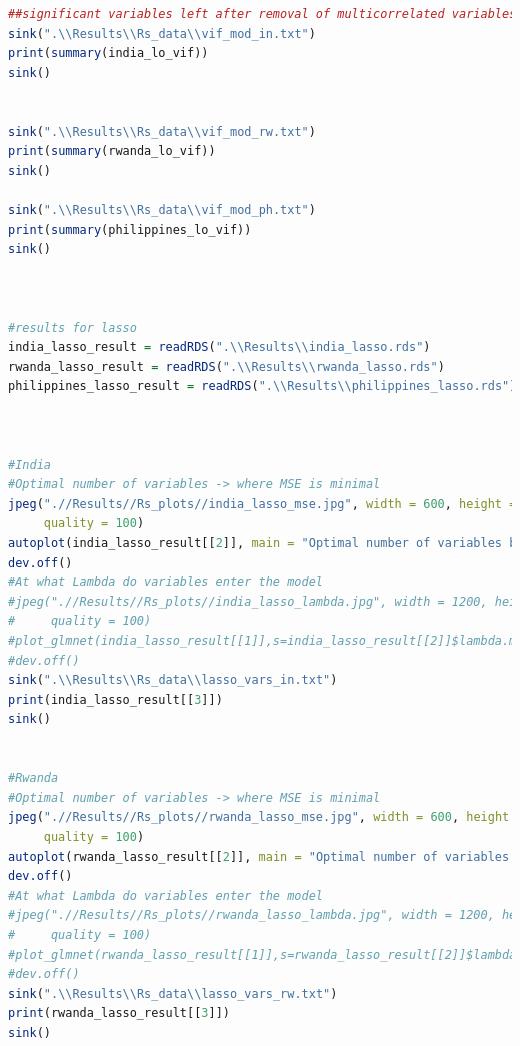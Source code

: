 \documentclass[11pt]{article}
\begin{document}
\begin{lstlisting}[language= R]
##significant variables left after removal of multicorrelated variables by removeVif()
sink(".\\Results\\Rs_data\\vif_mod_in.txt")
print(summary(india_lo_vif))
sink() 


sink(".\\Results\\Rs_data\\vif_mod_rw.txt")
print(summary(rwanda_lo_vif))
sink() 

sink(".\\Results\\Rs_data\\vif_mod_ph.txt")
print(summary(philippines_lo_vif))
sink() 



#results for lasso
india_lasso_result = readRDS(".\\Results\\india_lasso.rds")
rwanda_lasso_result = readRDS(".\\Results\\rwanda_lasso.rds")
philippines_lasso_result = readRDS(".\\Results\\philippines_lasso.rds")



#India
#Optimal number of variables -> where MSE is minimal
jpeg(".//Results//Rs_plots//india_lasso_mse.jpg", width = 600, height = 600, units = "px", pointsize = 20,
     quality = 100)
autoplot(india_lasso_result[[2]], main = "Optimal number of variables by MSE for India")
dev.off()
#At what Lambda do variables enter the model
#jpeg(".//Results//Rs_plots//india_lasso_lambda.jpg", width = 1200, height = 1400, units = "px", pointsize = 20,
#     quality = 100)
#plot_glmnet(india_lasso_result[[1]],s=india_lasso_result[[2]]$lambda.min,col =india_lasso_result[[3]]$colors, label = TRUE )
#dev.off()
sink(".\\Results\\Rs_data\\lasso_vars_in.txt")
print(india_lasso_result[[3]])
sink() 


#Rwanda
#Optimal number of variables -> where MSE is minimal
jpeg(".//Results//Rs_plots//rwanda_lasso_mse.jpg", width = 600, height = 600, units = "px", pointsize = 20,
     quality = 100)
autoplot(rwanda_lasso_result[[2]], main = "Optimal number of variables by MSE for Rwanda")
dev.off()
#At what Lambda do variables enter the model
#jpeg(".//Results//Rs_plots//rwanda_lasso_lambda.jpg", width = 1200, height = 1200, units = "px", pointsize = 20,
#     quality = 100)
#plot_glmnet(rwanda_lasso_result[[1]],s=rwanda_lasso_result[[2]]$lambda.min,col =rwanda_lasso_result[[3]]$colors, label = TRUE )
#dev.off()
sink(".\\Results\\Rs_data\\lasso_vars_rw.txt")
print(rwanda_lasso_result[[3]])
sink() 



\end{lstlisting}
\end{document}
